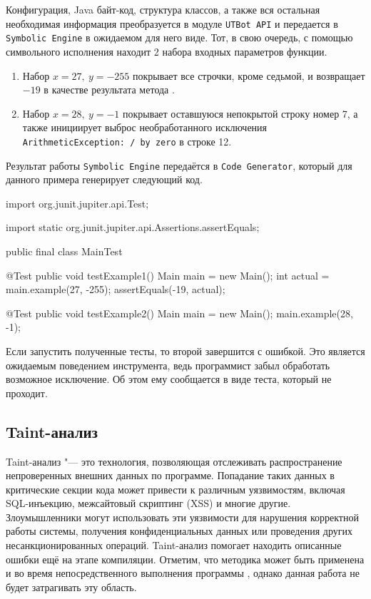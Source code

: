 Конфигурация, Java байт-код, структура классов, а также вся остальная необходимая информация преобразуется в модуле \verb|UTBot API| и передается в \verb|Symbolic Engine| в ожидаемом для него виде. Тот, в свою очередь, с помощью символьного исполнения находит 2 набора входных параметров функции.
\begin{enumerate}
    \item Набор $x = 27, ~ y = -255$ покрывает все строчки, кроме седьмой, и возвращает $-19$ в качестве результата метода .
    \item Набор $x = 28, ~ y = -1$ покрывает оставшуюся непокрытой строку номер 7, а также инициирует выброс необработанного исключения \verb|ArithmeticException: / by zero| в строке 12.
\end{enumerate}

Результат работы \verb|Symbolic Engine| передаётся в \verb|Code Generator|, который для данного примера генерирует следующий код.

\begin{code}
import org.junit.jupiter.api.Test;

import static org.junit.jupiter.api.Assertions.assertEquals;

public final class MainTest {

    @Test
    public void testExample1() {
        Main main = new Main();
        int actual = main.example(27, -255);
        assertEquals(-19, actual);
    }

    @Test
    public void testExample2() {
        Main main = new Main();
        main.example(28, -1);
    }
}
\end{code}

Если запустить полученные тесты, то второй завершится с ошибкой. Это является ожидаемым поведением инструмента, ведь программист забыл обработать возможное исключение. Об этом ему сообщается в виде теста, который не проходит.

\newpage

\subsection{Taint-анализ}

Taint-анализ \cite{taint} "--- это технология, позволяющая отслеживать распространение непроверенных внешних данных по программе. Попадание таких данных в критические секции кода может привести к различным уязвимостям, включая SQL-инъекцию, межсайтовый скриптинг (XSS) и многие другие. Злоумышленники могут использовать эти уязвимости для нарушения корректной работы системы, получения конфиденциальных данных или проведения других несанкционированных операций. Taint-анализ помогает находить описанные ошибки ещё на этапе компиляции. Отметим, что методика может быть применена и во время непосредственного выполнения программы \cite{dyn-taint}, однако данная работа не будет затрагивать эту область.

